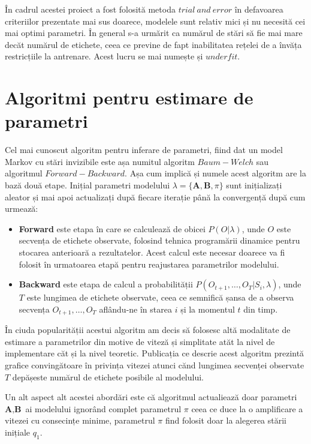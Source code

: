 În cadrul acestei proiect a fost folosită metoda $trial\ and\ error$ în defavoarea criteriilor prezentate mai sus doarece, modelele sunt relativ mici și nu necesită cei mai optimi parametri. În general s-a urmărit ca numărul de stări să fie mai mare decăt numărul de etichete, ceea ce previne de fapt inabilitatea rețelei de a învăța restricțiile la antrenare. Acest lucru se mai numește și $underfit$.\par

\section{Algoritmi pentru estimare de parametri}

Cel mai cunoscut algoritm pentru inferare de parametri, fiind dat un model Markov cu stări invizibile este așa numitul algoritm $Baum-Welch$ sau algoritmul $Forward-Backward$. Așa cum implică și numele acest algoritm are la bază două etape. Inițial parametri modelului $\lambda = \{\textbf{A},\textbf{B},\pi\}$ sunt inițializați aleator și mai apoi actualizați după fiecare iterație până la convergență după cum urmează:
\begin{itemize}
\item{\textbf{Forward} este etapa în care se calculează de obicei $P(O|\lambda)$, unde $O$ este secvența de etichete observate, folosind tehnica programării dinamice pentru stocarea anterioară a rezultatelor. Acest calcul este necesar doarece va fi folosit în urmatoarea etapă pentru reajustarea parametrilor modelului.}
\item{\textbf{Backward} este etapa de calcul a probabilității $P(O_{t+1},\dots,O_{T}| S_{i},\lambda)$, unde $T$ este lungimea de etichete observate, ceea ce semnifică șansa de a observa secvența $O_{t+1},\dots,O_{T}$ aflându-ne în starea $i$ și la momentul $t$ din timp}.
\end{itemize}
\par

În ciuda popularității acestui algoritm am decis să folosesc altă modalitate de estimare a parametrilor din motive de viteză și simplitate atăt la nivel de implementare căt și la nivel teoretic. Publicația ce descrie acest algoritm prezintă grafice convingătoare în privința vitezei atunci cănd lungimea secvenței observate $T$ depășeste numărul de etichete posibile al modelului.\par

Un alt aspect alt acestei abordări este că algoritmul actualiează doar parametri $\textbf{A},\textbf{B}$ ai modelului ignorând complet parametrul $\pi$ ceea ce duce la o amplificare a vitezei cu consecințe minime, parametrul $\pi$  find folosit doar la alegerea stării inițiale $q_{1}$.\par

